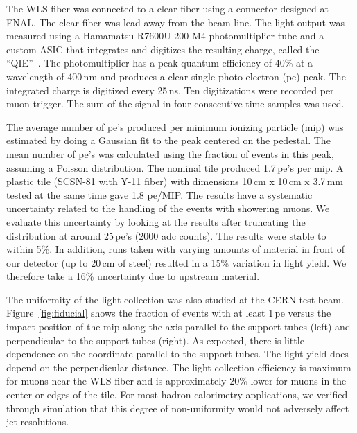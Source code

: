 \documentclass[review]{elsarticle}
\begin{document}
The WLS fiber was connected to a clear fiber using a
connector designed at FNAL. The clear fiber was lead away from the
beam line. The light output was measured using a Hamamatsu
R7600U-200-M4 photomultiplier tube and a custom ASIC that integrates
and digitizes the resulting charge, called the ``QIE''~\cite{qie}.
The photomultiplier has a peak quantum efficiency of 40\% at a
wavelength of 400\,nm and produces a clear single photo-electron (pe)
peak. The integrated charge is digitized every 25\,ns. Ten
digitizations were recorded per muon trigger. The sum of the signal
in four consecutive time samples was used.

The average number of pe's produced per minimum ionizing particle
(mip) was estimated by doing a Gaussian fit to the peak centered on
the pedestal. The mean number of pe's was calculated using the
fraction of events in this peak, assuming a Poisson distribution. The
nominal tile produced 1.7\,pe's per mip.
A plastic tile (SCSN-81 with Y-11 fiber) with dimensions 10\,cm x 10\,cm x 3.7\,mm tested
at the same time gave 1.8 pe/MIP.
The results
have a systematic uncertainty related to the handling of the events
with showering muons. We evaluate this uncertainty by looking at the
results after truncating the distribution at around 25\,pe's (2000 adc
counts). The results were stable to within 5\%. In addition, runs
taken with varying amounts of material in front of our detector
(up to 20\,cm of steel)
resulted in a 15\% variation in light yield.
We therefore take a 16\% uncertainty due to upstream material.

The uniformity of the light collection was also studied at the CERN
test beam. Figure~\ref{fig:fiducial} shows the fraction of events with at
least 1\,pe versus the impact position of the mip along the axis
parallel to the support tubes (left) and perpendicular to the support
tubes (right). As expected, there is little dependence on the
coordinate parallel to the support tubes. The light yield does depend
on the perpendicular distance. The light collection efficiency is
maximum for muons near the WLS fiber and is approximately 20\%
lower for muons in the center or edges of the tile. For most hadron
calorimetry applications, we verified through simulation that this
degree of non-uniformity would not adversely affect jet resolutions.
\end{document}

